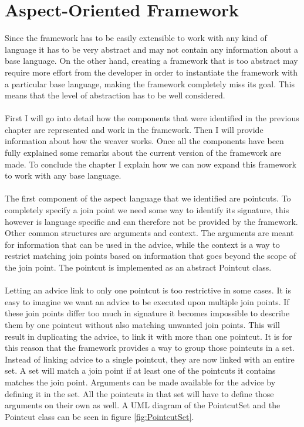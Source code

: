 \documentclass[a4paper]{report}
\begin{document}
\chapter{Aspect-Oriented Framework}
\label{chap:AOP_Framework}
Since the framework has to be easily extensible to work with any kind of language it has to be very abstract and may not contain any information about a base language. On the other hand, creating a framework that is too abstract may require more effort from the developer in order to instantiate the framework with a particular base language, making the framework completely miss its goal. This means that the level of abstraction has to be well considered.\\
\\
First I will go into detail how the components that were identified in the previous chapter are represented and work in the framework. Then I will provide information about how the weaver works. Once all the components have been fully explained some remarks about the current version of the framework are made. To conclude the chapter I explain how we can now expand this framework to work with any base language.\\
\\
The first component of the aspect language that we identified are pointcuts. To completely specify a join point we need some way to identify its signature, this however is language specific and can therefore not be provided by the framework. Other common structures are arguments and context. The arguments are meant for information that can be used in the advice, while the context is a way to restrict matching join points based on  information that goes beyond the scope of the join point. The pointcut is implemented as an abstract Pointcut class.\\
\\
Letting an advice link to only one pointcut is too restrictive in some cases. It is easy to imagine we want an advice to be executed upon multiple join points. If these join points differ too much in signature it becomes impossible to describe them by one pointcut without also matching unwanted join points. This will result in duplicating the advice, to link it with more than one pointcut. It is for this reason that the framework provides a way to group those pointcuts in a set. Instead of linking advice to a single pointcut, they are now linked with an entire set. A set will match a join point if at least one of the pointcuts it contains matches the join point. Arguments can be made available for the advice by defining it in the set. All the pointcuts in that set will have to define those arguments on their own as well. A UML diagram of the PointcutSet and the Pointcut class can be seen in figure \ref{fig:PointcutSet}.\\
\end{document}
